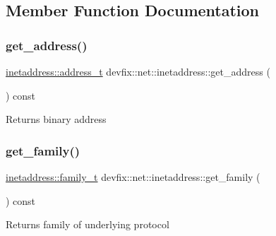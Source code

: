 \subsection{Member Function Documentation}
\mbox{\label{structdevfix_1_1net_1_1inetaddress_a8c606f2398a2d3c9436c4932d6c590b2}} 
\subsubsection{\texorpdfstring{get\+\_\+address()}{get\_address()}}
{\footnotesize\ttfamily \hyperlink{structdevfix_1_1net_1_1inetaddress_a2eb252de4b894131be8fcda68118bd77}{inetaddress\+::address\+\_\+t} devfix\+::net\+::inetaddress\+::get\+\_\+address (\begin{DoxyParamCaption}{ }\end{DoxyParamCaption}) const}

\begin{DoxyReturn}{Returns}
binary address 
\end{DoxyReturn}
\mbox{\label{structdevfix_1_1net_1_1inetaddress_a254e4950de6c6443a39196c6c7f58db4}} 
\subsubsection{\texorpdfstring{get\+\_\+family()}{get\_family()}}
{\footnotesize\ttfamily \hyperlink{structdevfix_1_1net_1_1inetaddress_a1c470962b4c9c675d475dba2344b50f4}{inetaddress\+::family\+\_\+t} devfix\+::net\+::inetaddress\+::get\+\_\+family (\begin{DoxyParamCaption}{ }\end{DoxyParamCaption}) const}

\begin{DoxyReturn}{Returns}
family of underlying protocol 
\end{DoxyReturn}
\mbox{\label{structdevfix_1_1net_1_1inetaddress_a4524692fae7a767e38600012c6f8f3cf}} 
